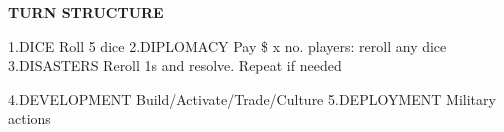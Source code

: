 \begin{flushleft}
  \textbf{TURN STRUCTURE}
\end{flushleft}
1.DICE {\color{supplemental} Roll 5 dice}
\newline
2.DIPLOMACY {\color{supplemental} Pay \$ x no. players: reroll any dice}
\newline
3.DISASTERS {\color{supplemental} Reroll 1s and resolve. Repeat if needed}
\newline

\newline
4.DEVELOPMENT {\color{supplemental} Build/Activate/Trade/Culture}
\newline
5.DEPLOYMENT {\color{supplemental} Military actions}
\newline
